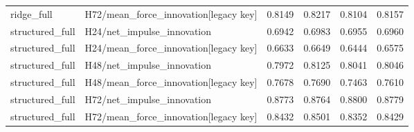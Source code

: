\documentclass[9pt,a4paper]{extarticle}
\begin{document}
\begin{longtable}{llrrrr}
ridge\_full & H72/mean\_force\_innovation[legacy key] & 0.8149 & 0.8217 & 0.8104 & 0.8157 \\
structured\_full & H24/net\_impulse\_innovation & 0.6942 & 0.6983 & 0.6955 & 0.6960 \\
structured\_full & H24/mean\_force\_innovation[legacy key] & 0.6633 & 0.6649 & 0.6444 & 0.6575 \\
structured\_full & H48/net\_impulse\_innovation & 0.7972 & 0.8125 & 0.8041 & 0.8046 \\
structured\_full & H48/mean\_force\_innovation[legacy key] & 0.7678 & 0.7690 & 0.7463 & 0.7610 \\
structured\_full & H72/net\_impulse\_innovation & 0.8773 & 0.8764 & 0.8800 & 0.8779 \\
structured\_full & H72/mean\_force\_innovation[legacy key] & 0.8432 & 0.8501 & 0.8352 & 0.8429 \\
\bottomrule
\end{longtable}
\end{document}
